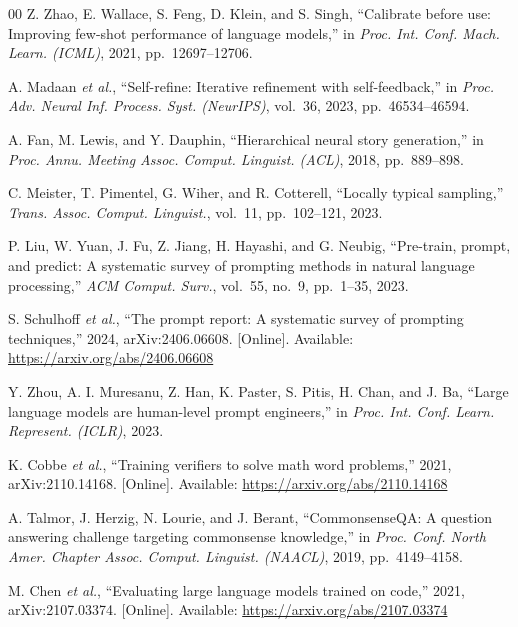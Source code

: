 \documentclass[conference]{IEEEtran}
\begin{document}
\begin{thebibliography}{00}
 Z. Zhao, E. Wallace, S. Feng, D. Klein, and S. Singh, ``Calibrate before use: Improving few-shot performance of language models,'' in \textit{Proc. Int. Conf. Mach. Learn. (ICML)}, 2021, pp.\ 12697--12706.

 A. Madaan \textit{et al.}, ``Self-refine: Iterative refinement with self-feedback,'' in \textit{Proc. Adv. Neural Inf. Process. Syst. (NeurIPS)}, vol.\ 36, 2023, pp.\ 46534--46594.

 A. Fan, M. Lewis, and Y. Dauphin, ``Hierarchical neural story generation,'' in \textit{Proc. Annu. Meeting Assoc. Comput. Linguist. (ACL)}, 2018, pp.\ 889--898.

 C. Meister, T. Pimentel, G. Wiher, and R. Cotterell, ``Locally typical sampling,'' \textit{Trans. Assoc. Comput. Linguist.}, vol.\ 11, pp.\ 102--121, 2023.

 P. Liu, W. Yuan, J. Fu, Z. Jiang, H. Hayashi, and G. Neubig, ``Pre-train, prompt, and predict: A systematic survey of prompting methods in natural language processing,'' \textit{ACM Comput. Surv.}, vol.\ 55, no.\ 9, pp.\ 1--35, 2023.

 S. Schulhoff \textit{et al.}, ``The prompt report: A systematic survey of prompting techniques,'' 2024, arXiv:2406.06608. [Online]. Available: \url{https://arxiv.org/abs/2406.06608}

 Y. Zhou, A. I. Muresanu, Z. Han, K. Paster, S. Pitis, H. Chan, and J. Ba, ``Large language models are human-level prompt engineers,'' in \textit{Proc. Int. Conf. Learn. Represent. (ICLR)}, 2023.

 K. Cobbe \textit{et al.}, ``Training verifiers to solve math word problems,'' 2021, arXiv:2110.14168. [Online]. Available: \url{https://arxiv.org/abs/2110.14168}

 A. Talmor, J. Herzig, N. Lourie, and J. Berant, ``CommonsenseQA: A question answering challenge targeting commonsense knowledge,'' in \textit{Proc. Conf. North Amer. Chapter Assoc. Comput. Linguist. (NAACL)}, 2019, pp.\ 4149--4158.

 M. Chen \textit{et al.}, ``Evaluating large language models trained on code,'' 2021, arXiv:2107.03374. [Online]. Available: \url{https://arxiv.org/abs/2107.03374}

\end{thebibliography}

\vspace{12pt}
\end{document}
